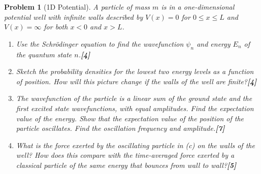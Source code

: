 \documentclass[a4paper]{article}
\theoremstyle{new}
\newtheorem{qns}{Problem}[subsection]
\begin{document}
\newpage
\begin{qns}[1D Potential]
A particle of mass $m$ is in a one-dimensional potential well with infinite walls described by $V(x)=0$ for $0\leq x\leq L$ and $V(x)=\infty$ for both $x < 0$ and $x > L$.
\begin{enumerate}[label=(\alph*)]
\item Use the Schrödinger equation to find the wavefunction $\psi_n$ and energy $E_n$ of the quantum state $n$.\hfill\textbf{[4]}
\item Sketch the probability densities for the lowest two energy levels as a function of position. How will this picture change if the walls of the well are finite?\hfill\textbf{[4]}
\item The wavefunction of the particle is a linear sum of the ground state and the first excited state wavefunctions, with equal amplitudes. Find the expectation value of the energy. Show that the expectation value of the position of the particle oscillates. Find the oscillation frequency and amplitude.\hfill\textbf{[7]}
\item What is the force exerted by the oscillating particle in (c) on the walls of the well? How does this compare with the time-averaged force exerted by a classical particle of the same energy that bounces from wall to wall?\hfill\textbf{[5]}
\end{enumerate}
\end{qns}
\end{document}
